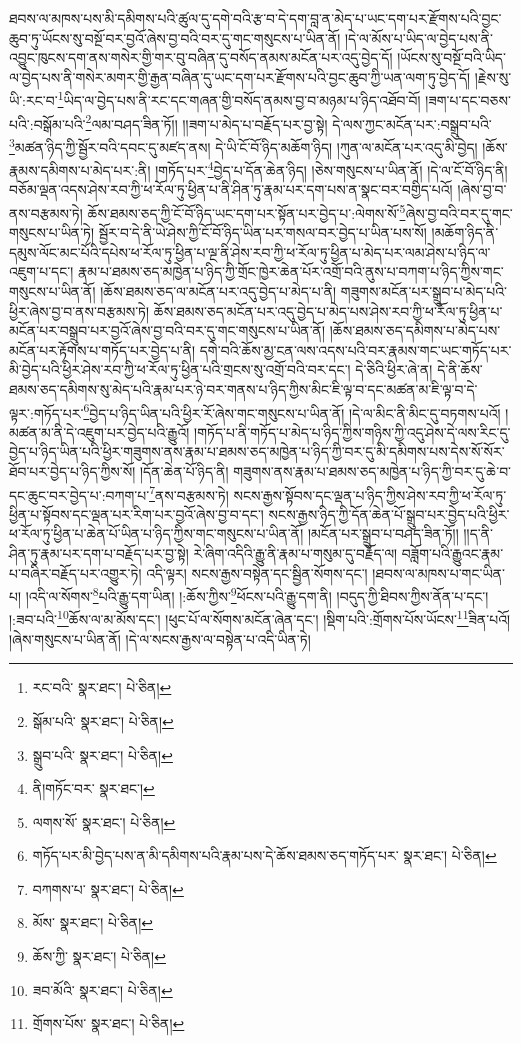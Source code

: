 ཐབས་ལ་མཁས་པས་མི་དམིགས་པའི་ཚུལ་དུ་དགེ་བའི་རྩ་བ་དེ་དག་བླ་ན་མེད་པ་ཡང་དག་པར་རྫོགས་པའི་བྱང་ཆུབ་ཏུ་ཡོངས་སུ་བསྔོ་བར་བྱའོ་ཞེས་བྱ་བའི་བར་དུ་གང་གསུངས་པ་ཡིན་ནོ། །དེ་ལ་མོས་པ་ཡིད་ལ་བྱེད་པས་ནི་འབྱུང་ཁུངས་དག་ནས་གསེར་གྱི་གར་བུ་བཞིན་དུ་བསོད་ནམས་མངོན་པར་འདུ་བྱེད་དོ། །ཡོངས་སུ་བསྔོ་བའི་ཡིད་ལ་བྱེད་པས་ནི་གསེར་མགར་གྱི་རྒྱན་བཞིན་དུ་ཡང་དག་པར་རྫོགས་པའི་བྱང་ཆུབ་ཀྱི་ཡན་ལག་ཏུ་བྱེད་དོ། །རྗེས་སུ་ཡི་:རང་བ་\footnote{རང་བའི་  སྣར་ཐང་།  པེ་ཅིན། }ཡིད་ལ་བྱེད་པས་ནི་རང་དང་གཞན་གྱི་བསོད་ནམས་བྱ་བ་མཉམ་པ་ཉིད་འཐོབ་བོ། །ཟག་པ་དང་བཅས་པའི་:བསྒོམ་པའི་\footnote{སྒོམ་པའི་  སྣར་ཐང་།  པེ་ཅིན། }ལམ་བཤད་ཟིན་ཏོ།། །།ཟག་པ་མེད་པ་བརྗོད་པར་བྱ་སྟེ། དེ་ལས་ཀྱང་མངོན་པར་:བསྒྲུབ་པའི་\footnote{སྒྲུབ་པའི་  སྣར་ཐང་།  པེ་ཅིན། }མཚན་ཉིད་ཀྱི་སྦྱོར་བའི་དབང་དུ་མཛད་ནས། དེ་ཡི་ངོ་བོ་ཉིད་མཆོག་ཉིད། །ཀུན་ལ་མངོན་པར་འདུ་མི་བྱེད། །ཆོས་རྣམས་དམིགས་པ་མེད་པར་:ནི། །གཏོད་པར་\footnote{ནི།གཏོང་བར་  སྣར་ཐང་། }བྱེད་པ་དོན་ཆེན་ཉིད། །ཅེས་གསུངས་པ་ཡིན་ནོ། །དེ་ལ་ངོ་བོ་ཉིད་ནི། བཅོམ་ལྡན་འདས་ཤེས་རབ་ཀྱི་ཕ་རོལ་ཏུ་ཕྱིན་པ་ནི་ཤིན་ཏུ་རྣམ་པར་དག་པས་ན་སྣང་བར་བགྱིད་པའོ། །ཞེས་བྱ་བ་ནས་བརྩམས་ཏེ། ཆོས་ཐམས་ཅད་ཀྱི་ངོ་བོ་ཉིད་ཡང་དག་པར་སྟོན་པར་བྱེད་པ་:ལེགས་སོ་\footnote{ལགས་སོ་  སྣར་ཐང་།  པེ་ཅིན། }ཞེས་བྱ་བའི་བར་དུ་གང་གསུངས་པ་ཡིན་ཏེ། སྦྱོར་བ་དེ་ནི་ཡེ་ཤེས་ཀྱི་ངོ་བོ་ཉིད་ཡིན་པར་གསལ་བར་བྱེད་པ་ཡིན་པས་སོ། །མཆོག་ཉིད་ནི་དམུས་ལོང་མང་པོའི་དཔེས་ཕ་རོལ་ཏུ་ཕྱིན་པ་ལྔ་ནི་ཤེས་རབ་ཀྱི་ཕ་རོལ་ཏུ་ཕྱིན་པ་མེད་པར་ལམ་ཤེས་པ་ཉིད་ལ་འཇུག་པ་དང་། རྣམ་པ་ཐམས་ཅད་མཁྱེན་པ་ཉིད་ཀྱི་གྲོང་ཁྱེར་ཆེན་པོར་འགྲོ་བའི་ནུས་པ་བཀག་པ་ཉིད་ཀྱིས་གང་གསུངས་པ་ཡིན་ནོ། །ཆོས་ཐམས་ཅད་ལ་མངོན་པར་འདུ་བྱེད་པ་མེད་པ་ནི། གཟུགས་མངོན་པར་སྒྲུབ་པ་མེད་པའི་ཕྱིར་ཞེས་བྱ་བ་ནས་བརྩམས་ཏེ། ཆོས་ཐམས་ཅད་མངོན་པར་འདུ་བྱེད་པ་མེད་པས་ཤེས་རབ་ཀྱི་ཕ་རོལ་ཏུ་ཕྱིན་པ་མངོན་པར་བསྒྲུབ་པར་བྱའོ་ཞེས་བྱ་བའི་བར་དུ་གང་གསུངས་པ་ཡིན་ནོ། །ཆོས་ཐམས་ཅད་དམིགས་པ་མེད་པས་མངོན་པར་རྟོགས་པ་གཏོད་པར་བྱེད་པ་ནི། དགེ་བའི་ཆོས་མྱ་ངན་ལས་འདས་པའི་བར་རྣམས་གང་ཡང་གཏོད་པར་མི་བྱེད་པའི་ཕྱིར་ཤེས་རབ་ཀྱི་ཕ་རོལ་ཏུ་ཕྱིན་པའི་གྲངས་སུ་འགྲོ་བའི་བར་དང་། དེ་ཅིའི་ཕྱིར་ཞེ་ན། དེ་ནི་ཆོས་ཐམས་ཅད་དམིགས་སུ་མེད་པའི་རྣམ་པར་ཉེ་བར་གནས་པ་ཉིད་ཀྱིས་མིང་ཇི་ལྟ་བ་དང་མཚན་མ་ཇི་ལྟ་བ་དེ་ལྟར་:གཏོད་པར་\footnote{གཏོད་པར་མི་བྱེད་པས་ན་མི་དམིགས་པའི་རྣམ་པས་དེ་ཆོས་ཐམས་ཅད་གཏོད་པར་  སྣར་ཐང་།  པེ་ཅིན། }བྱེད་པ་ཉིད་ཡིན་པའི་ཕྱིར་རོ་ཞེས་གང་གསུངས་པ་ཡིན་ནོ། །དེ་ལ་མིང་ནི་མིང་དུ་བཏགས་པའོ། །མཚན་མ་ནི་དེ་འཇུག་པར་བྱེད་པའི་རྒྱུའོ། །གཏོད་པ་ནི་གཏོད་པ་མེད་པ་ཉིད་ཀྱིས་གཉིས་ཀྱི་འདུ་ཤེས་དེ་ལས་རིང་དུ་བྱེད་པ་ཉིད་ཡིན་པའི་ཕྱིར་གཟུགས་ནས་རྣམ་པ་ཐམས་ཅད་མཁྱེན་པ་ཉིད་ཀྱི་བར་དུ་མི་དམིགས་པས་དེས་སོ་སོར་ཐོབ་པར་བྱེད་པ་ཉིད་ཀྱིས་སོ། །དོན་ཆེན་པོ་ཉིད་ནི། གཟུགས་ནས་རྣམ་པ་ཐམས་ཅད་མཁྱེན་པ་ཉིད་ཀྱི་བར་དུ་ཆེ་བ་དང་ཆུང་བར་བྱེད་པ་:བཀག་པ་\footnote{བཀགས་པ་  སྣར་ཐང་།  པེ་ཅིན། }ནས་བརྩམས་ཏེ། སངས་རྒྱས་སྟོབས་དང་ལྡན་པ་ཉིད་ཀྱིས་ཤེས་རབ་ཀྱི་ཕ་རོལ་ཏུ་ཕྱིན་པ་སྟོབས་དང་ལྡན་པར་རིག་པར་བྱའོ་ཞེས་བྱ་བ་དང་། སངས་རྒྱས་ཉིད་ཀྱི་དོན་ཆེན་པོ་སྒྲུབ་པར་བྱེད་པའི་ཕྱིར་ཕ་རོལ་ཏུ་ཕྱིན་པ་ཆེན་པོ་ཡིན་པ་ཉིད་ཀྱིས་གང་གསུངས་པ་ཡིན་ནོ། །མངོན་པར་སྒྲུབ་པ་བཤད་ཟིན་ཏོ།། །།ད་ནི་ཤིན་ཏུ་རྣམ་པར་དག་པ་བརྗོད་པར་བྱ་སྟེ། རེ་ཞིག་འདིའི་རྒྱུ་ནི་རྣམ་པ་གསུམ་དུ་བརྗོད་ལ། བཟློག་པའི་རྒྱུའང་རྣམ་པ་བཞིར་བརྗོད་པར་འགྱུར་ཏེ། འདི་ལྟར། སངས་རྒྱས་བསྟེན་དང་སྦྱིན་སོགས་དང་། །ཐབས་ལ་མཁས་པ་གང་ཡིན་པ། །འདི་ལ་སོགས་\footnote{མོས་  སྣར་ཐང་།  པེ་ཅིན། }པའི་རྒྱུ་དག་ཡིན། །:ཆོས་ཀྱིས་\footnote{ཆོས་ཀྱི་  སྣར་ཐང་།  པེ་ཅིན། }ཕོངས་པའི་རྒྱུ་དག་ནི། །བདུད་ཀྱི་ཐིབས་ཀྱིས་ནོན་པ་དང་། །:ཟབ་པའི་\footnote{ཟབ་མོའི་  སྣར་ཐང་།  པེ་ཅིན། }ཆོས་ལ་མ་མོས་དང་། །ཕུང་པོ་ལ་སོགས་མངོན་ཞེན་དང་། །སྡིག་པའི་:གྲོགས་པོས་ཡོངས་\footnote{གྲོགས་པོས་  སྣར་ཐང་།  པེ་ཅིན། }ཟིན་པའོ། །ཞེས་གསུངས་པ་ཡིན་ནོ། །དེ་ལ་སངས་རྒྱས་ལ་བསྟེན་པ་འདི་ཡིན་ཏེ། 